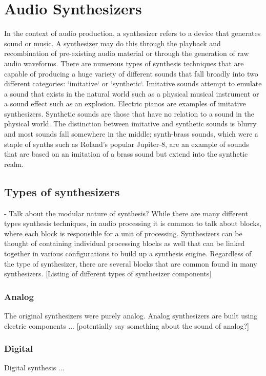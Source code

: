 \section{Audio Synthesizers}
In the context of audio production, a synthesizer refers to a device that generates sound or music. A synthesizer may do this through the playback and recombination of pre-existing audio material or through the generation of raw audio waveforms. There are numerous types of synthesis techniques that are capable of producing a huge variety of different sounds that fall broadly into two different categories: `imitative` or `synthetic`. Imitative sounds attempt to emulate a sound that exists in the natural world such as a physical musical instrument or a sound effect such as an explosion. Electric pianos are examples of imitative synthesizers. Synthetic sounds are those that have no relation to a sound in the physical world. The distinction between imitative and synthetic sounds is blurry and most sounds fall somewhere in the middle; synth-brass sounds, which were a staple of synths such as Roland's popular Jupiter-8, are an example of sounds that are based on an imitation of a brass sound but extend into the synthetic realm. 

\subsection{Types of synthesizers}
- Talk about the modular nature of synthesis? While there are many different types synthesis techniques, in audio processing it is common to talk about blocks, where each block is responsible for a unit of processing. Synthesizers can be thought of containing individual processing blocks as well that can be linked together in various configurations to build up a synthesis engine. Regardless of the type of synthesizer, there are several blocks that are common found in many synthesizers. [Listing of different types of synthesizer components]
\subsubsection{Analog}
The original synthesizers were purely analog. Analog synthesizers are built using electric components ... [potentially say something about the sound of analog?]

\subsubsection{Digital}
Digital synthesis ...

